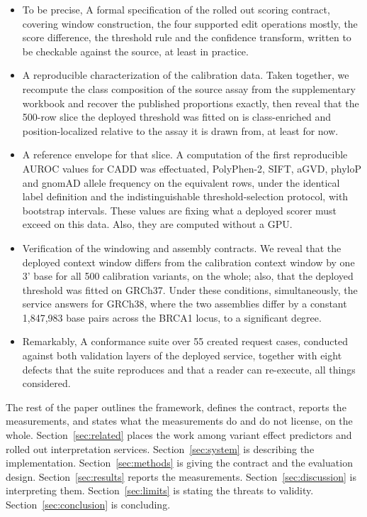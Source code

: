 \documentclass[10pt,journal]{IEEEtran}
\begin{document}
\begin{itemize}
\item To be precise, A formal specification of the rolled out scoring contract, covering window construction, the four supported edit operations mostly, the score difference, the threshold rule and the confidence transform, written to be checkable against the source, at least in practice.
\item A reproducible characterization of the calibration data. Taken together, we recompute the class composition of the source assay from the supplementary workbook and recover the published proportions exactly, then reveal that the 500-row slice the deployed threshold was fitted on is class-enriched and position-localized relative to the assay it is drawn from, at least for now.
\item A reference envelope for that slice. A computation of the first reproducible AUROC values for CADD was effectuated, PolyPhen-2, SIFT, aGVD, phyloP and gnomAD allele frequency on the equivalent rows, under the identical label definition and the indistinguishable threshold-selection protocol, with bootstrap intervals. These values are fixing what a deployed scorer must exceed on this data. Also, they are computed without a GPU.
\item Verification of the windowing and assembly contracts. We reveal that the deployed context window differs from the calibration context window by one 3' base for all 500 calibration variants, on the whole; also, that the deployed threshold was fitted on GRCh37. Under these conditions, simultaneously, the service answers for GRCh38, where the two assemblies differ by a constant 1{,}847{,}983 base pairs across the BRCA1 locus, to a significant degree.
\item Remarkably, A conformance suite over 55 created request cases, conducted against both validation layers of the deployed service, together with eight defects that the suite reproduces and that a reader can re-execute, all things considered.
\end{itemize}

The rest of the paper outlines the framework, defines the contract, reports the measurements, and states what the measurements do and do not license, on the whole. Section~\ref{sec:related} places the work among variant effect predictors and rolled out interpretation services. Section~\ref{sec:system} is describing the implementation. Section~\ref{sec:methods} is giving the contract and the evaluation design. Section~\ref{sec:results} reports the measurements. Section~\ref{sec:discussion} is interpreting them. Section~\ref{sec:limits} is stating the threats to validity. Section~\ref{sec:conclusion} is concluding.
\end{document}
